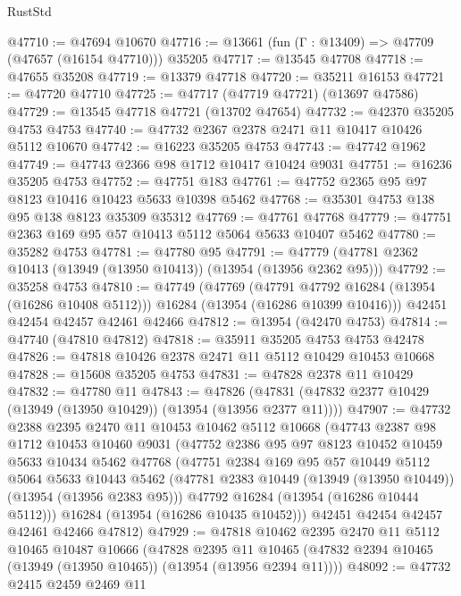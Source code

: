 \begin{lexlean}{RustStd}
\begin{coremodule}
@47710 := @47694 @10670
@47716 := @13661 (fun (Γ : @13409) => @47709 (@47657 (@16154 @47710))) @35205
@47717 := @13545 @47708
@47718 := @47655 @35208
@47719 := @13379 @47718
@47720 := @35211 @16153
@47721 := @47720 @47710
@47725 := @47717 (@47719 @47721) (@13697 @47586)
@47729 := @13545 @47718 @47721 (@13702 @47654)
@47732 := @42370 @35205 @4753 @4753
@47740 := @47732 @2367 @2378 @2471 @11 @10417 @10426 @5112 @10670
@47742 := @16223 @35205 @4753
@47743 := @47742 @1962
@47749 := @47743 @2366 @98 @1712 @10417 @10424 @9031
@47751 := @16236 @35205 @4753
@47752 := @47751 @183
@47761 := @47752 @2365 @95 @97 @8123 @10416 @10423 @5633 @10398 @5462
@47768 := @35301 @4753 @138 @95 @138 @8123 @35309 @35312
@47769 := @47761 @47768
@47779 := @47751 @2363 @169 @95 @57 @10413 @5112 @5064 @5633 @10407 @5462
@47780 := @35282 @4753
@47781 := @47780 @95
@47791 := @47779 (@47781 @2362 @10413 (@13949 (@13950 @10413)) (@13954 (@13956 @2362 @95)))
@47792 := @35258 @4753
@47810 := @47749
    (@47769
      (@47791 @47792 @16284 (@13954 (@16286 @10408 @5112)))
      @16284
      (@13954 (@16286 @10399 @10416)))
    @42451
    @42454
    @42457
    @42461
    @42466
@47812 := @13954 (@42470 @4753)
@47814 := @47740 (@47810 @47812)
@47818 := @35911 @35205 @4753 @4753 @42478
@47826 := @47818 @10426 @2378 @2471 @11 @5112 @10429 @10453 @10668
@47828 := @15608 @35205 @4753
@47831 := @47828 @2378 @11 @10429
@47832 := @47780 @11
@47843 := @47826 (@47831 (@47832 @2377 @10429 (@13949 (@13950 @10429)) (@13954 (@13956 @2377 @11))))
@47907 := @47732
    @2388
    @2395
    @2470
    @11
    @10453
    @10462
    @5112
    @10668
    (@47743
      @2387
      @98
      @1712
      @10453
      @10460
      @9031
      (@47752
        @2386
        @95
        @97
        @8123
        @10452
        @10459
        @5633
        @10434
        @5462
        @47768
        (@47751
          @2384
          @169
          @95
          @57
          @10449
          @5112
          @5064
          @5633
          @10443
          @5462
          (@47781 @2383 @10449 (@13949 (@13950 @10449)) (@13954 (@13956 @2383 @95)))
          @47792
          @16284
          (@13954 (@16286 @10444 @5112)))
        @16284
        (@13954 (@16286 @10435 @10452)))
      @42451
      @42454
      @42457
      @42461
      @42466
      @47812)
@47929 := @47818
    @10462
    @2395
    @2470
    @11
    @5112
    @10465
    @10487
    @10666
    (@47828
      @2395
      @11
      @10465
      (@47832 @2394 @10465 (@13949 (@13950 @10465)) (@13954 (@13956 @2394 @11))))
@48092 := @47732
    @2415
    @2459
    @2469
    @11

\end{coremodule}
\end{lexlean}
